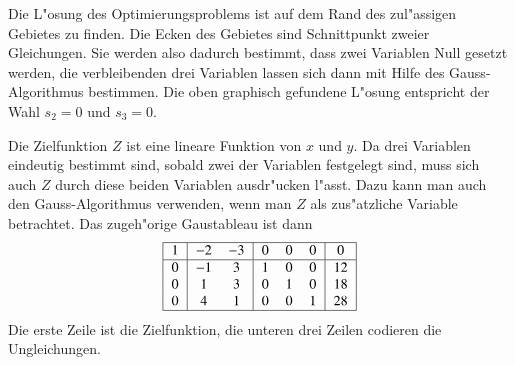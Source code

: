 Die L"osung des Optimierungsproblems ist auf dem Rand des
zul"assigen Gebietes zu finden.
Die Ecken des Gebietes sind Schnittpunkt zweier Gleichungen.
Sie werden also dadurch bestimmt, dass zwei Variablen 
Null gesetzt werden, die verbleibenden drei Variablen
lassen sich dann mit Hilfe des Gauss-Algorithmus bestimmen.
Die oben graphisch gefundene L"osung entspricht der
Wahl $s_2=0$ und $s_3=0$.

Die Zielfunktion $Z$ ist eine lineare Funktion von $x$ und $y$.
Da drei Variablen eindeutig bestimmt sind, sobald zwei der
Variablen festgelegt sind, muss sich auch $Z$ durch diese beiden
Variablen ausdr"ucken l"asst. Dazu kann man auch den Gauss-Algorithmus
verwenden, wenn man $Z$ als zus"atzliche Variable betrachtet.
Das zugeh"orige Gaustableau ist dann
\[
\begin{tabular}{|>{$}c<{$}|>{$}c<{$}>{$}c<{$}|>{$}c<{$}>{$}c<{$}>{$}c<{$}|>{$}c<{$}|}
\hline
1&-2&-3& 0& 0& 0& 0\\
\hline
0&-1& 3& 1& 0& 0&12\\
0& 1& 3& 0& 1& 0&18\\
0& 4& 1& 0& 0& 1&28\\
\hline
\end{tabular}
\]
Die erste Zeile ist die Zielfunktion, die unteren drei Zeilen codieren die
Ungleichungen.

